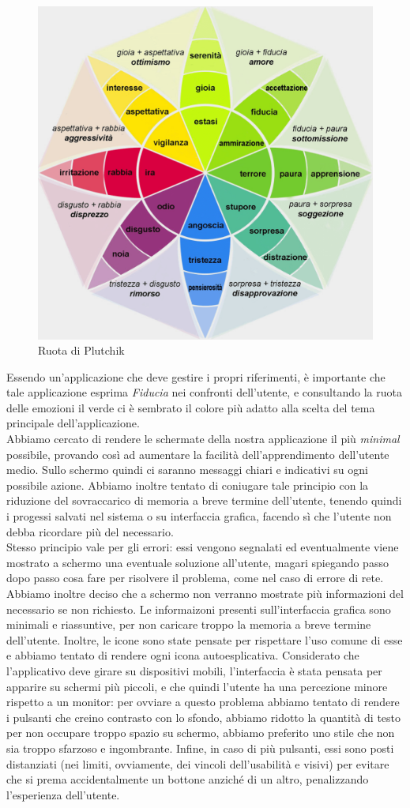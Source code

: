 \begin{figure}[H]
    \centering
            \includegraphics[width=.40\textwidth]{Immagini/Ruota di Plutchik.png} 
    \caption{Ruota di Plutchik}
\end{figure}

Essendo un'applicazione che deve gestire i propri riferimenti, è importante che tale applicazione esprima \textit{Fiducia} nei confronti dell'utente, e consultando la ruota delle emozioni il verde ci è sembrato il colore più adatto alla scelta del tema principale dell'applicazione. \\
Abbiamo cercato di rendere le schermate della nostra applicazione il più \textit{minimal} possibile, provando così ad aumentare la facilità dell'apprendimento dell'utente medio. Sullo schermo quindi ci saranno messaggi chiari e indicativi su ogni possibile azione. Abbiamo inoltre tentato di coniugare tale principio con la riduzione del sovraccarico di memoria a breve termine dell'utente, tenendo quindi i progessi salvati nel sistema o su interfaccia grafica, facendo sì che l'utente non debba ricordare più del necessario. \\
Stesso principio vale per gli errori: essi vengono segnalati ed eventualmente viene mostrato a schermo una eventuale soluzione all'utente, magari spiegando passo dopo passo cosa fare per risolvere il problema, come nel caso di errore di rete. 
Abbiamo inoltre deciso che a schermo non verranno mostrate più informazioni del necessario se non richiesto. Le informaizoni presenti sull'interfaccia grafica sono minimali e riassuntive, per non caricare troppo la memoria a breve termine dell'utente. Inoltre, le icone sono state pensate per rispettare l'uso comune di esse e abbiamo tentato di rendere ogni icona autoesplicativa. Considerato che l'applicativo deve girare su dispositivi mobili, l'interfaccia è stata pensata per apparire su schermi più piccoli, e che quindi l'utente ha una percezione minore rispetto a un monitor: per ovviare a questo problema abbiamo tentato di rendere i pulsanti che creino contrasto con lo sfondo, abbiamo ridotto la quantità di testo per non occupare troppo spazio su schermo, abbiamo preferito uno stile che non sia troppo sfarzoso e ingombrante. Infine, in caso di più pulsanti, essi sono posti distanziati (nei limiti, ovviamente, dei vincoli dell'usabilità e visivi) per evitare che si prema accidentalmente un bottone anziché di un altro, penalizzando l'esperienza dell'utente.

